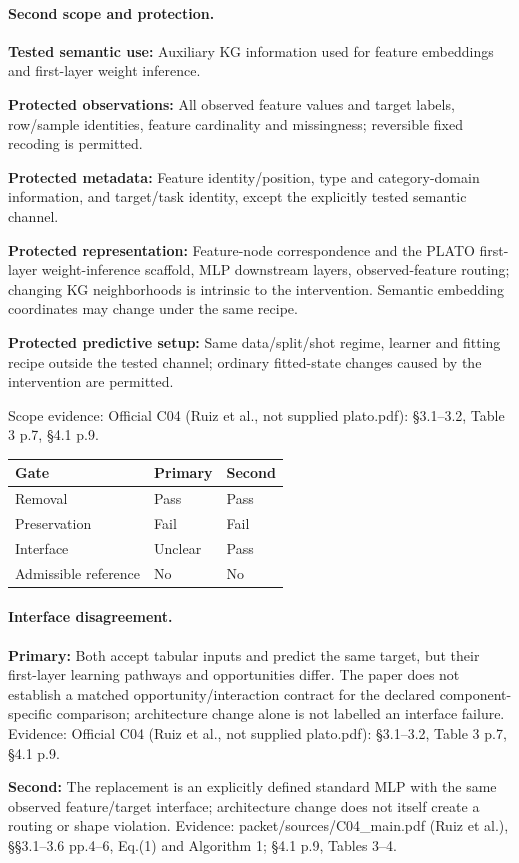 \documentclass[10pt]{article}
\begin{document}
\paragraph{Second scope and protection.}
\textbf{Tested semantic use:} Auxiliary KG information used for feature embeddings and first-layer weight inference.\par
\textbf{Protected observations:} All observed feature values and target labels, row/sample identities, feature cardinality and missingness; reversible fixed recoding is permitted.\par
\textbf{Protected metadata:} Feature identity/position, type and category-domain information, and target/task identity, except the explicitly tested semantic channel.\par
\textbf{Protected representation:} Feature-node correspondence and the PLATO first-layer weight-inference scaffold, MLP downstream layers, observed-feature routing; changing KG neighborhoods is intrinsic to the intervention. Semantic embedding coordinates may change under the same recipe.\par
\textbf{Protected predictive setup:} Same data/split/shot regime, learner and fitting recipe outside the tested channel; ordinary fitted-state changes caused by the intervention are permitted.\par
Scope evidence: Official C04 (Ruiz et al., not supplied plato.pdf): §3.1--3.2, Table 3 p.7, §4.1 p.9.\par
\begin{tabular}{lll}\toprule Gate & Primary & Second \\ \midrule
Removal & Pass & Pass \\
Preservation & Fail & Fail \\
Interface & Unclear & Pass \\
Admissible reference & No & No \\
\bottomrule\end{tabular}
\paragraph{Interface disagreement.}
\textbf{Primary:} Both accept tabular inputs and predict the same target, but their first-layer learning pathways and opportunities differ. The paper does not establish a matched opportunity/interaction contract for the declared component-specific comparison; architecture change alone is not labelled an interface failure. Evidence: Official C04 (Ruiz et al., not supplied plato.pdf): §3.1--3.2, Table 3 p.7, §4.1 p.9.\par
\textbf{Second:} The replacement is an explicitly defined standard MLP with the same observed feature/target interface; architecture change does not itself create a routing or shape violation. Evidence: packet/sources/C04\_main.pdf (Ruiz et al.), §§3.1--3.6 pp.4--6, Eq.(1) and Algorithm 1; §4.1 p.9, Tables 3--4.\par
\end{document}
